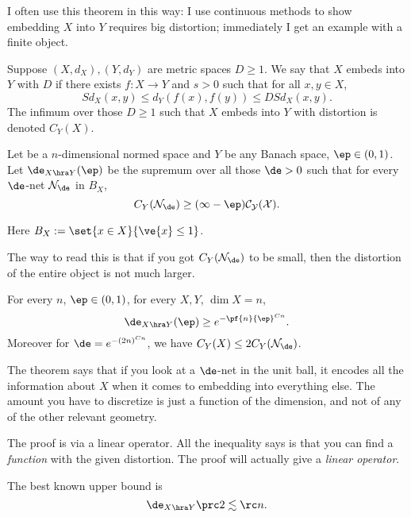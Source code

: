 I often use this theorem in this way: I use continuous methods to show embedding $X$ into $Y$ requires big distortion; immediately I get an example with a finite object.
\begin{df}
Suppose $(X,d_X),(Y,d_Y)$ are metric spaces $D\ge 1$. We say that $X$ embeds into $Y$ with  $D$ if there exists $f:X\to Y$ and $s>0$ such that for all $x,y\in X$,
\[
Sd_X(x,y) \le d_Y(f(x),f(y)) \le DSd_X(x,y).
\]
The infimum over those $D\ge 1$ such that $X$ embeds into $Y$ with distortion is denoted $C_Y(X)$.
\end{df}
\begin{df}
Let be a $n$-dimensional normed space and $Y$ be any Banach space, $\ep\in (0,1)$. Let $\de_{X\hra Y}(\ep)$ be the supremum over all those $\de>0$ such that for every $\de$-net $\cal N_\de$ in $B_X$, 
\[C_Y(\cal N_\de)\ge (1-\ep)C_Y(X).\]

Here $B_X:=\set{x\in X}{\ve{x}\le 1}$.
\end{df}
The way to read this is that if you got $C_Y(\cal N_\de)$ to be small, then the distortion of the entire object is not much larger.
\begin{thm}\label{thm:bdt}
For every $n$, $\ep\in (0,1)$, for every $X,Y$, $\dim X=n$, 
\[
\de_{X\hra Y}(\ep)\ge  e^{-\pf{n}{\ep}^{Cn}}.
\]
Moreover for $\de=e^{-(2n)^{Cn}}$, we have $C_Y(X)\le 2C_Y(\cal N_\de)$.
\end{thm}
The theorem says that if you look at a $\de$-net in the unit ball, it encodes all the information about $X$ when it comes to embedding into everything else. %
The amount you have to discretize is just a function of the dimension, and not of any of the other relevant geometry.
\begin{rem}
The proof is via a linear operator. All the inequality says is that you can find a \emph{function} with the given distortion. The proof will actually give a \emph{linear operator}. 
\end{rem}

The best known upper bound is 
\[
\de_{X\hra Y}\prc2 \lesssim\rc n.
\]

